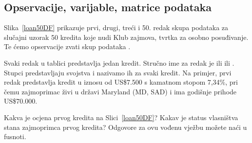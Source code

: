 
\subsection{Opservacije, varijable, matrice podataka}



Slika~\ref{loan50DF} prikazuje prvi, drugi, treći i 50. redak skupa podataka za slučajni uzorak 50 kredita koje nudi Klub zajmova, tvrtka za osobno posuđivanje.
Te ćemo opservacije zvati skup podataka .


Svaki redak u tablici predstavlja jedan kredit. Stručno ime za redak je  ili  ili . Stupci predstavljaju svojstva i nazivamo ih  za svaki kredit.
Na primjer, prvi redak predstavlja kredit u iznosu od US\$7.500 s kamatnom stopom 7,34\%, pri čemu zajmoprimac živi u državi Maryland (MD, SAD) i ima godišnje prihode  US\$70.000.


\begin{exercisewrap}
	\begin{nexercise}
		Kakva je ocjena prvog kredita na Slici~\ref{loan50DF}?
		Kakav je status vlasništva stana zajmoprimca prvog kredita?
		Odgovore za ovu vođenu vježbu možete naći u fusnoti.\footnotemark{}
	\end{nexercise}
\end{exercisewrap}

